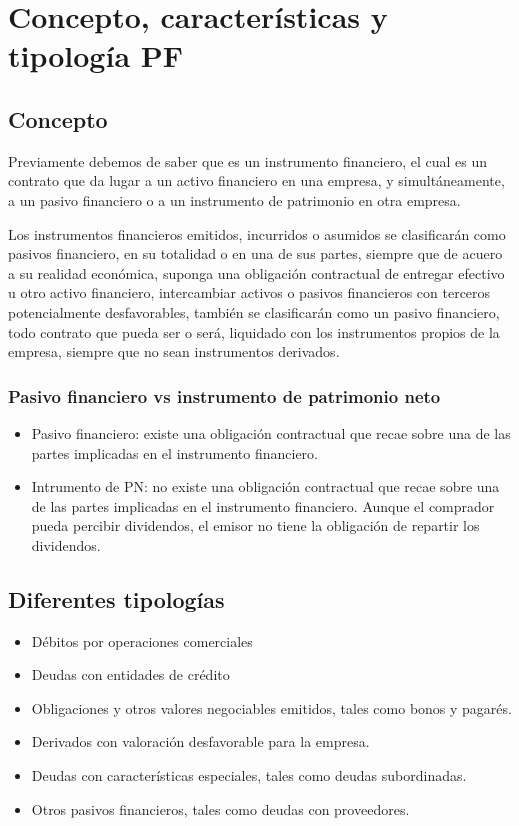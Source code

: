 \section{Concepto, características y tipología PF}

\subsection{Concepto}

Previamente debemos de saber que es un instrumento financiero, el cual es un contrato que da lugar a un activo financiero en una empresa, y simultáneamente, a un pasivo financiero o a un instrumento de patrimonio en otra empresa.

Los instrumentos financieros emitidos, incurridos o asumidos se clasificarán como pasivos financiero, en su totalidad o en una de sus partes, siempre que de acuero a su realidad económica, suponga una obligación contractual de entregar efectivo u otro activo financiero, intercambiar activos o pasivos financieros con terceros potencialmente desfavorables, también se clasificarán como un pasivo financiero, todo contrato que pueda ser o será, liquidado con los instrumentos propios de la empresa, siempre que no sean instrumentos derivados.

\subsubsection{Pasivo financiero vs instrumento de patrimonio neto}

\begin{itemize}
    \item Pasivo financiero: existe una obligación contractual que recae sobre una de las partes implicadas en el instrumento financiero. 
    \item Intrumento de PN: no existe una obligación contractual que recae sobre una de las partes implicadas en el instrumento financiero. Aunque el comprador pueda percibir dividendos, el emisor no tiene la obligación de repartir los dividendos.
\end{itemize}

\subsection{Diferentes tipologías}

\begin{itemize}
    \item Débitos por operaciones comerciales
    \item Deudas con entidades de crédito
    \item Obligaciones y otros valores negociables emitidos, tales como bonos y pagarés.
    \item Derivados con valoración desfavorable para la empresa.
    \item Deudas con características especiales, tales como deudas subordinadas.
    \item Otros pasivos financieros, tales como deudas con proveedores.
\end{itemize}

